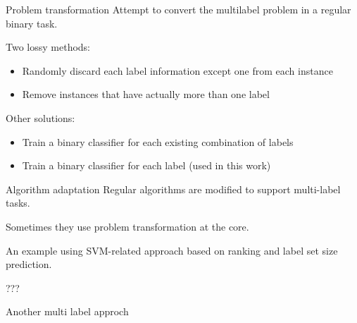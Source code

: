 \begin{frame}{Problem transformation}
	Attempt to convert the multilabel problem in a regular binary task.
	
	Two lossy methods:
	\begin{itemize}\setlength\itemsep{1em}
		\item Randomly discard each label information except one from each instance
		\item Remove instances that have actually more than one label
	\end{itemize}
	Other solutions:
	\begin{itemize}\setlength\itemsep{1em}
		\item Train a binary classifier for each existing combination of labels
		\item Train a binary classifier for each label (used in this work)
	\end{itemize}
\end{frame}

\begin{frame}{Algorithm adaptation}
	Regular algorithms are modified to support multi-label tasks.
	
	Sometimes they use problem transformation at the core.
	
	An example using SVM-related approach based on ranking and label set size prediction.
	
	\color{red}???
\end{frame}

\begin{frame}{Another multi label approch}
	
	\begin{flushright}
		\cite{ml1}
	\end{flushright}
\end{frame}
